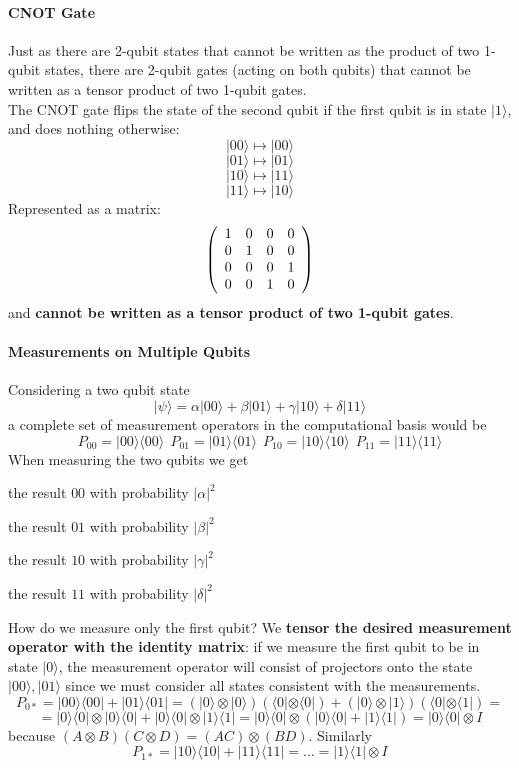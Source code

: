 \documentclass[10pt]{report}
\begin{document}
\paragraph{CNOT Gate} Just as there are 2-qubit states that cannot be written as the product of two 1-qubit states, there are 2-qubit gates (acting on both qubits) that cannot be written as a tensor product of two 1-qubit gates.\\
The CNOT gate flips the state of the second qubit if the first qubit is in state $|1\rangle$, and does nothing otherwise:
$$|00\rangle\mapsto|00\rangle$$
$$|01\rangle\mapsto|01\rangle$$
$$|10\rangle\mapsto|11\rangle$$
$$|11\rangle\mapsto|10\rangle$$
Represented as a matrix:
$$\left(\begin{array}{c c c c}
1&0&0&0\\
0&1&0&0\\
0&0&0&1\\
0&0&1&0
\end{array}\right)$$
and \textbf{cannot be written as a tensor product of two 1-qubit gates}.
\paragraph{Measurements on Multiple Qubits} Considering a two qubit state
$$|\psi\rangle=\alpha|00\rangle+\beta|01\rangle+\gamma|10\rangle+\delta|11\rangle$$
a complete set of measurement operators in the computational basis would be 
$$P_{00} = |00\rangle\langle00\rangle\:\:P_{01} = |01\rangle\langle01\rangle\:\:P_{10} = |10\rangle\langle10\rangle\:\:P_{11} = |11\rangle\langle11\rangle$$
When measuring the two qubits we get\begin{list}{}{}
	\item the result $00$ with probability $|\alpha|^2$
	\item the result $01$ with probability $|\beta|^2$
	\item the result $10$ with probability $|\gamma|^2$
	\item the result $11$ with probability $|\delta|^2$
\end{list}
How do we measure only the first qubit? We \textbf{tensor the desired measurement operator with the identity matrix}: if we measure the first qubit to be in state $|0\rangle$, the measurement operator will consist of projectors onto the state $|00\rangle,|01\rangle$ since we must consider all states consistent with the measurements.
$$P_{0*} = |00\rangle\langle00| + |01\rangle\langle01| = (|0\rangle\otimes|0\rangle)(\langle0|\otimes\langle0|) + (|0\rangle\otimes|1\rangle)(\langle0|\otimes\langle1|) =$$
$$=|0\rangle\langle0|\otimes|0\rangle\langle0|+|0\rangle\langle0|\otimes|1\rangle\langle1| = |0\rangle\langle0|\otimes(|0\rangle\langle0|+|1\rangle\langle1|) = |0\rangle\langle0|\otimes I$$
because $(A\otimes B)(C\otimes D) = (AC)\otimes(BD)$. Similarly
$$P_{1*} = |10\rangle\langle10|+|11\rangle\langle11| = \ldots = |1\rangle\langle1|\otimes I$$
\pagebreak
\end{document}
